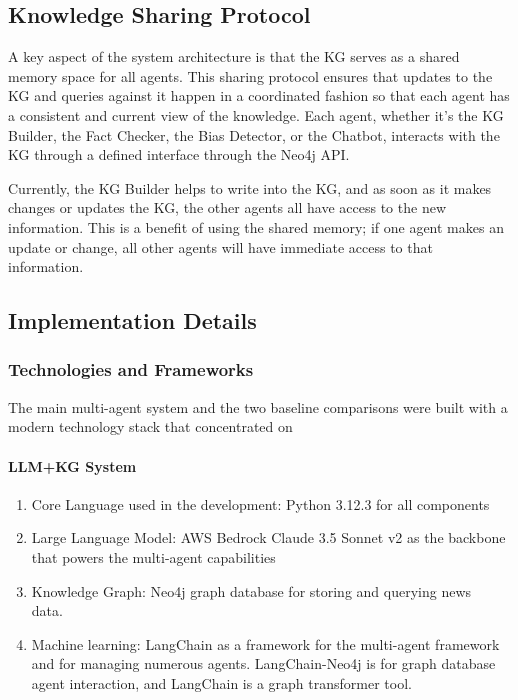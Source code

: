 \documentclass[11pt]{article}
\begin{document}
\subsection{Knowledge Sharing Protocol}
A key aspect of the system architecture is that the KG serves as a shared memory space for all agents. This sharing protocol ensures that updates to the KG and queries against it happen in a coordinated fashion so that each agent has a consistent and current view of the knowledge. Each agent, whether it’s the KG Builder, the Fact Checker, the Bias Detector, or the Chatbot, interacts with the KG through a defined interface through the Neo4j API.

Currently, the KG Builder helps to write into the KG, and as soon as it makes changes or updates the KG, the other agents all have access to the new information. This is a benefit of using the shared memory; if one agent makes an update or change, all other agents will have immediate access to that information.

\subsection{Implementation Details}
\subsubsection{Technologies and Frameworks}
The main multi-agent system and the two baseline comparisons were built with a modern technology stack that concentrated  on

\paragraph{LLM+KG System}

\begin{enumerate}
    \item Core Language used in the development: Python 3.12.3 for all components
    \item Large Language Model: AWS Bedrock Claude 3.5 Sonnet v2 as the backbone that powers the multi-agent capabilities
\item Knowledge Graph: Neo4j graph database for storing and querying news data.  
\item Machine learning:  LangChain as a framework for the multi-agent framework and for managing numerous agents. LangChain-Neo4j is for graph database agent interaction, and  LangChain is a graph transformer tool.
\end{enumerate}
\end{document}
